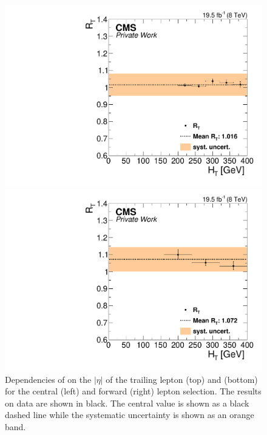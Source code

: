 \begin{figure}[htbp]
\begin{minipage}[t]{0.49\textwidth}
  \includegraphics[width=\textwidth]{plots/BG/trigger/Triggereff_SFvsOF_Syst_AlphaT_HighHTExclusiveCentral_Full2012_HT_None.pdf}
\end{minipage}
\begin{minipage}[t]{0.49\textwidth}
\includegraphics[width=\textwidth]{plots/BG/trigger/Triggereff_SFvsOF_Syst_AlphaT_HighHTExclusiveForward_Full2012_HT_None.pdf}
\end{minipage}
\caption{Dependencies of \RT on the $|\eta|$ of the trailing lepton (top) and \HT (bottom) for the central (left) and forward (right) lepton selection. The results on data are shown in black. The central value is shown as a black dashed line while the systematic uncertainty is shown as an orange band.}
\label{fig:RTDependenciesApp2}
\end{figure}  

